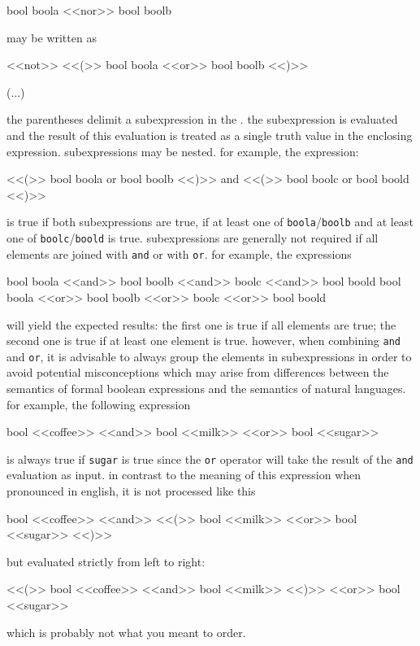 \begin{marglist}
\begin{ltxcode}
bool {boola} <<nor>> bool {boolb}
\end{ltxcode}
%
may be written as

\begin{ltxcode}
<<not>> <<(>> bool {boola} <<or>> bool {boolb} <<)>>
\end{ltxcode}

\item[(...)]

the parentheses delimit a subexpression in the . the subexpression is evaluated and the result of this evaluation is treated as a single truth value in the enclosing expression. subexpressions may be nested. for example, the expression:

\begin{ltxcode}
  <<(>> bool {boola} or bool {boolb} <<)>>
  and
  <<(>> bool {boolc} or bool {boold} <<)>>
\end{ltxcode}
%
is true if both subexpressions are true, \ie if at least one of \texttt{boola}/\texttt{boolb} and at least one of \texttt{boolc}/\texttt{boold} is true. subexpressions are generally not required if all elements are joined with \texttt{and} or with \texttt{or}. for example, the expressions

\begin{ltxcode}
bool {boola} <<and>> bool {boolb} <<and>> {boolc} <<and>> bool {boold}
bool {boola} <<or>> bool {boolb} <<or>> {boolc} <<or>> bool {boold}
\end{ltxcode}
%
will yield the expected results: the first one is true if all elements are true; the second one is true if at least one element is true. however, when combining \texttt{and} and \texttt{or}, it is advisable to always group the elements in subexpressions in order to avoid potential misconceptions which may arise from differences between the semantics of formal boolean expressions and the semantics of natural languages. for example, the following expression

\begin{ltxcode}
bool {<<coffee>>} <<and>> bool {<<milk>>} <<or>> bool {<<sugar>>}
\end{ltxcode}
%
is always true if \texttt{sugar} is true since the \texttt{or} operator will take the result of the \texttt{and} evaluation as input. in contrast to the meaning of this expression when pronounced in english, it is not processed like this

\begin{ltxcode}
bool {<<coffee>>} <<and>> <<(>> bool {<<milk>>} <<or>> bool {<<sugar>>} <<)>>
\end{ltxcode}
%
but evaluated strictly from left to right:

\begin{ltxcode}
<<(>> bool {<<coffee>>} <<and>> bool {<<milk>>} <<)>> <<or>> bool {<<sugar>>}
\end{ltxcode}
%
which is probably not what you meant to order.

\end{marglist}

